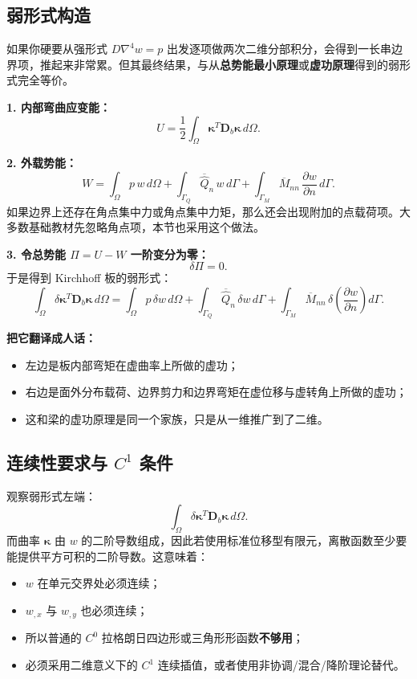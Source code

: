 \documentclass[11pt, a4paper, UTF8]{ctexart}
\begin{document}
\subsection{弱形式构造}
如果你硬要从强形式 $D\nabla^4 w = p$ 出发逐项做两次二维分部积分，会得到一长串边界项，推起来非常累。但其最终结果，与从\textbf{总势能最小原理}或\textbf{虚功原理}得到的弱形式完全等价。

\textbf{1. 内部弯曲应变能：}
\[
U =
\frac{1}{2}
\int_{\Omega}
\bm{\kappa}^T \bm{D}_b \bm{\kappa}
\,
d\Omega.
\]

\textbf{2. 外载势能：}
\[
W =
\int_{\Omega} p\, w\, d\Omega
+
\int_{\Gamma_Q} \overline{\widehat{Q}}_n\, w\, d\Gamma
+
\int_{\Gamma_M} \overline{M}_{nn}\, \frac{\partial w}{\partial n}\, d\Gamma.
\]
如果边界上还存在角点集中力或角点集中力矩，那么还会出现附加的点载荷项。大多数基础教材先忽略角点项，本节也采用这个做法。

\textbf{3. 令总势能 $\Pi = U-W$ 一阶变分为零：}
\[
\delta \Pi = 0.
\]
于是得到 Kirchhoff 板的弱形式：
\[
\int_{\Omega}
\delta \bm{\kappa}^T \bm{D}_b \bm{\kappa}
\,
d\Omega
=
\int_{\Omega} p\, \delta w\, d\Omega
+
\int_{\Gamma_Q} \overline{\widehat{Q}}_n\, \delta w\, d\Gamma
+
\int_{\Gamma_M} \overline{M}_{nn}\, \delta \left(\frac{\partial w}{\partial n}\right) d\Gamma.
\]

\textbf{把它翻译成人话：}
\begin{itemize}
    \item 左边是板内部弯矩在虚曲率上所做的虚功；
    \item 右边是面外分布载荷、边界剪力和边界弯矩在虚位移与虚转角上所做的虚功；
    \item 这和梁的虚功原理是同一个家族，只是从一维推广到了二维。
\end{itemize}

\subsection{连续性要求与 $C^1$ 条件}
观察弱形式左端：
\[
\int_{\Omega}
\delta \bm{\kappa}^T \bm{D}_b \bm{\kappa}
\,
d\Omega.
\]
而曲率 $\bm{\kappa}$ 由 $w$ 的二阶导数组成，因此若使用标准位移型有限元，离散函数至少要能提供平方可积的二阶导数。这意味着：
\begin{itemize}
    \item $w$ 在单元交界处必须连续；
    \item $w_{,x}$ 与 $w_{,y}$ 也必须连续；
    \item 所以普通的 $C^0$ 拉格朗日四边形或三角形形函数\textbf{不够用}；
    \item 必须采用二维意义下的 $C^1$ 连续插值，或者使用非协调/混合/降阶理论替代。
\end{itemize}
\end{document}

